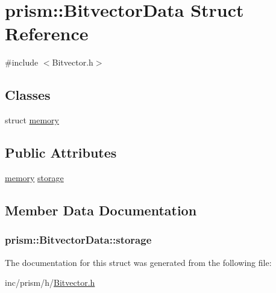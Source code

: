 \hypertarget{structprism_1_1_bitvector_data}{}\section{prism\+:\+:Bitvector\+Data Struct Reference}
\label{structprism_1_1_bitvector_data}


{\ttfamily \#include $<$Bitvector.\+h$>$}

\subsection*{Classes}
\begin{DoxyCompactItemize}
\item 
struct \hyperlink{structprism_1_1_bitvector_data_1_1memory}{memory}
\end{DoxyCompactItemize}
\subsection*{Public Attributes}
\begin{DoxyCompactItemize}
\item 
\hyperlink{structprism_1_1_bitvector_data_1_1memory}{memory} \hyperlink{structprism_1_1_bitvector_data_abcf70b2679d4c52bf398a1a308aca5c2}{storage}
\end{DoxyCompactItemize}


\subsection{Member Data Documentation}
\subsubsection[{\texorpdfstring{storage}{storage}}]{ prism\+::\+Bitvector\+Data\+::storage}\hypertarget{structprism_1_1_bitvector_data_abcf70b2679d4c52bf398a1a308aca5c2}{}\label{structprism_1_1_bitvector_data_abcf70b2679d4c52bf398a1a308aca5c2}


The documentation for this struct was generated from the following file\+:\begin{DoxyCompactItemize}
\item 
inc/prism/h/\hyperlink{_bitvector_8h}{Bitvector.\+h}\end{DoxyCompactItemize}
